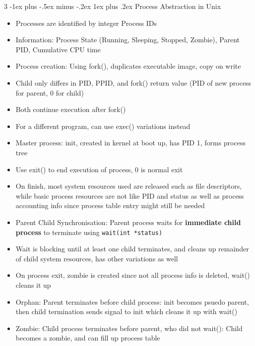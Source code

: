 \documentclass[10pt, landscape]{article}
\makeatletter
\renewcommand{\subsection}{\@startsection{subsection}{3}{0mm}%
                                {-1ex plus -.5ex minus -.2ex}%
                                {1ex plus .2ex}%
                                {\normalfont\small\bfseries}}%
\makeatother
\begin{document}
\begin{multicols*}{3}
\subsection{Process Abstraction in Unix}
\begin{itemize}
    \item Processes are identified by integer Process IDs
    \item Information: Process State (Running, Sleeping, Stopped, Zombie), Parent PID, Cumulative CPU time
    \item Process creation: Using fork(), duplicates executable image, copy on write
    \item Child only differs in PID, PPID, and fork() return value (PID of new process for parent, 0 for child)
    \item Both continue execution after fork()
    \item For a different program, can use exec() variations instead
    \item Master process: init, created in kernel at boot up, has PID 1, forms process tree
    \item Use exit() to end execution of process, 0 is normal exit
    \item On finish, most system resources used are released such as file descriptors, while basic process resources are not like PID and status as well as process accounting info since process table entry might still be needed
    \item Parent Child Synchronisation: Parent process waits for \textbf{immediate child process} to terminate using \verb|wait(int *status)|
    \item Wait is blocking until at least one child terminates, and cleans up remainder of child system resources, has other variations as well
    \item On process exit, zombie is created since not all process info is deleted, wait() cleans it up
    \item Orphan: Parent terminates before child process: init becomes psuedo parent, then child termination sends signal to init which cleans it up with wait()
    \item Zombie: Child process terminates before parent, who did not wait(): Child becomes a zombie, and can fill up process table
\end{itemize}


\end{multicols*}
\end{document}
